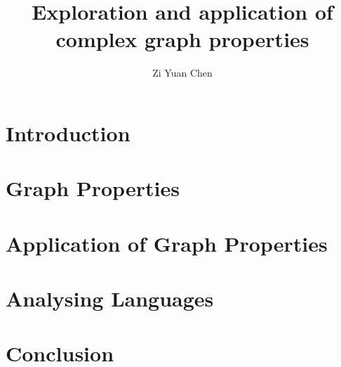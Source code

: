 \documentclass[12pt]{report}
\title{Exploration and application of complex graph properties}
\author{Zi Yuan Chen}
\date{}
\begin{document}



%




\tableofcontents


\listoffigures

\listoftables


\chapter{Introduction}


\chapter{Graph Properties}


\chapter{Application of Graph Properties}


\chapter{Analysing Languages}


\chapter{Conclusion}






\end{document}
